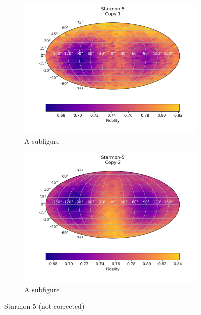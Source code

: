 \begin{figure}[H]
    \centering
    \begin{subfigure}{.5\textwidth}
      \centering
      \includegraphics[width=\textwidth]{Figures/PhaseCovariant/Starmon/FullSphere/results_starmon.txt_copy1.png}
      \caption{A subfigure}
      \label{fig:pc_starmon5_sphere_1}
    \end{subfigure}%
    \begin{subfigure}{.5\textwidth}
      \centering
      \includegraphics[width=\textwidth]{Figures/PhaseCovariant/Starmon/FullSphere/results_starmon.txt_copy2.png}
      \caption{A subfigure}
      \label{fig:pc_starmon5_sphere_2}
    \end{subfigure}
    \caption{Starmon-5 (not corrected)}
    \label{fig:pc_starmon5_sphere}
\end{figure}
